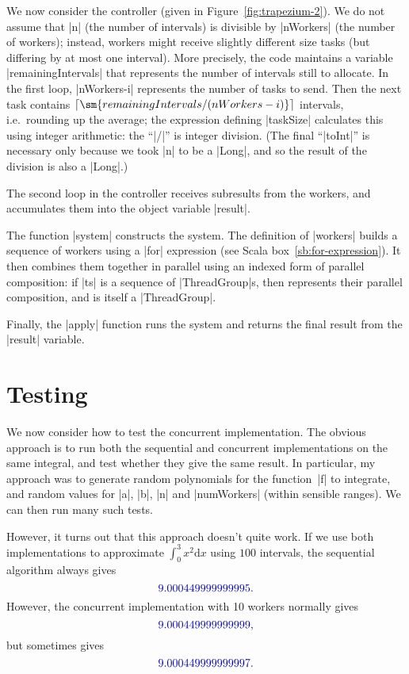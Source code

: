We now consider the controller (given in Figure~\ref{fig:trapezium-2}).  We do
not assume that |n| (the number of intervals) is divisible by |nWorkers| (the
number of workers); instead, workers might receive slightly different size
tasks (but differing by at most one interval).  More precisely, the code
maintains a variable |remainingIntervals| that represents the number of
intervals still to allocate.  In the first loop, |nWorkers-i| represents the
number of tasks to send.  Then the next task contains $\lceil
\sm{remainingIntervals/(nWorkers-i)} \rceil$ intervals, i.e.~rounding up the
average; the expression defining |taskSize| calculates this using integer
arithmetic: the ``|/|'' is integer division.  (The final ``|toInt|'' is
necessary only because we took |n| to be a |Long|, and so the result of the
division is also a |Long|.)

The second loop in the controller receives subresults from the workers, 
and accumulates them into the object variable |result|.

The function |system| constructs the system.  The definition of |workers|
builds a sequence of workers using a |for| expression (see Scala
box~\ref{sb:for-expression}).  It then combines them together in parallel
using an indexed form of parallel composition: if |ts| is a sequence of
|ThreadGroup|s, then  represents their parallel composition,
and is itself a |ThreadGroup|.


Finally, the |apply| function runs the system and returns the final result
from the |result| variable. 


\section{Testing}

We now consider how to test the concurrent implementation.  The obvious
approach is to run both the sequential and concurrent implementations on the
same integral, and test whether they give the same result.  In particular, my
approach was to generate random polynomials for the function~|f| to integrate,
and random values for |a|, |b|, |n| and |numWorkers| (within sensible ranges).
We can then run many such tests.

However, it turns out that this approach doesn't quite work.  If we use both
implementations to approximate $\int_0^3 x^2 \mbox{d}x$ using $100$ intervals,
the sequential algorithm always gives
\[\mstyle
  9.000449999999995.
\]
However,  the concurrent implementation with 10 workers normally gives
\[\mstyle
  9.000449999999999,
\]
but sometimes gives
\[\mstyle
  9.000449999999997.
\]

